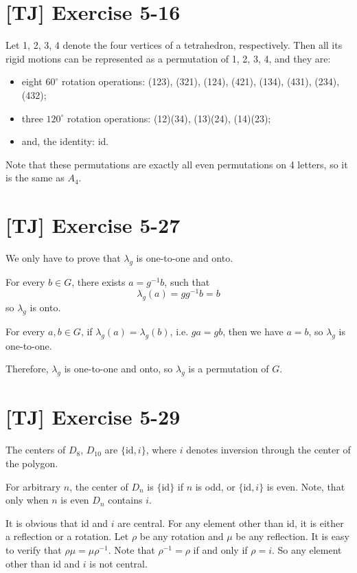\documentclass[a4paper,11pt,twocolumn]{article}
\begin{document}
  \section{[TJ] Exercise 5-16}
  Let 1, 2, 3, 4 denote the four vertices of a tetrahedron, respectively. Then all its rigid motions can be represented as a permutation of 1, 2, 3, 4, and they are:
  \begin{itemize}
    \item eight $60^\circ$ rotation operations: (123), (321), (124), (421), (134), (431), (234), (432);
    \item three $120^\circ$ rotation operations: (12)(34), (13)(24), (14)(23);
    \item and, the identity: id.
  \end{itemize}
  Note that these permutations are exactly all even permutations on 4 letters, so it is the same as $A_4$.

  \section{[TJ] Exercise 5-27}
  We only have to prove that $\lambda_g$ is one-to-one and onto. \par
  For every $b \in G$, there exists $a = g^{-1}b$, such that
  $$ \lambda_g(a) = gg^{-1}b = b$$
  so $\lambda_g$ is onto. \par
  For every $a, b \in G$, if $\lambda_g(a) = \lambda_g(b)$, i.e. $ga = gb$, then we have $a = b$, so $\lambda_g$ is one-to-one. \par
  Therefore, $\lambda_g$ is one-to-one and onto, so $\lambda_g$ is a permutation of $G$.

  \section{[TJ] Exercise 5-29}
  The centers of $D_8$, $D_10$ are $\{\text{id}, i\}$, where $i$ denotes inversion through the center of the polygon. \par
  For arbitrary $n$, the center of $D_n$ is $\{\text{id}\}$ if $n$ is odd, or $\{\text{id}, i\}$ is even. Note, that only when $n$ is even $D_n$ contains $i$. \par
  It is obvious that id and $i$ are central. For any element other than id, it is either a reflection or a rotation. Let $\rho$ be any rotation and $\mu$ be any reflection. It is easy to verify that $\rho \mu = \mu \rho^{-1}$. Note that $\rho^{-1} = \rho$ if and only if $\rho = i$. So any element other than id and $i$ is not central.
\end{document}
